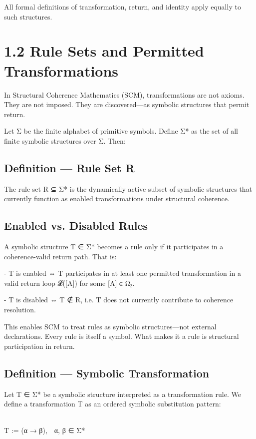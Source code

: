 All formal definitions of transformation, return, and identity apply equally to such structures.

\section{1.2 \textbar{} Rule Sets and Permitted
Transformations}\label{rule-sets-and-permitted-transformations}

In Structural Coherence Mathematics (SCM), transformations are not
axioms. They are not imposed. They are discovered---as symbolic
structures that permit return.

Let Σ be the finite alphabet of primitive symbols. Define Σ* as the set
of all finite symbolic structures over Σ. Then:

\subsection{Definition --- Rule Set R}\label{definition-rule-set-r}

The rule set R ⊆ Σ* is the dynamically active subset of symbolic
structures that currently function as enabled transformations under
structural coherence.

\subsection{Enabled vs. Disabled
Rules}\label{enabled-vs.-disabled-rules}

A symbolic structure T ∈ Σ* becomes a rule only if it participates in a
coherence-valid return path. That is:

- T is enabled ⇔ T participates in at least one permitted transformation
in a valid return loop 𝓛({[}A{]}) for some {[}A{]} ∈ Ω₃.

- T is disabled ⇔ T ∉ R, i.e. T does not currently contribute to
coherence resolution.

This enables SCM to treat rules as symbolic structures---not external
declarations. Every rule is itself a symbol. What makes it a rule is
structural participation in return.

\subsection{Definition --- Symbolic
Transformation}\label{definition-symbolic-transformation}

Let T ∈ Σ* be a symbolic structure interpreted as a transformation rule.
We define a transformation T as an ordered symbolic substitution
pattern:\\
\strut \\
T := (α → β), α, β ∈ Σ*

